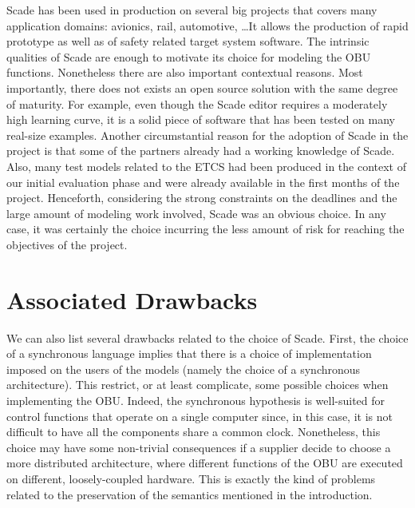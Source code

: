 \documentclass{template/openetcs_report}
\begin{document}
Scade has been used in production on several big projects that covers
many application domains: avionics, rail, automotive, \dots It allows
the production of rapid prototype as well as of safety related target
system software. The intrinsic qualities of Scade are enough to
motivate its choice for modeling the OBU functions. Nonetheless there
are also important contextual reasons. Most importantly, there does
not exists an open source solution with the same degree of
maturity. For example, even though the Scade editor requires a
moderately high learning curve, it is a solid piece of software that
has been tested on many real-size examples. Another circumstantial
reason for the adoption of Scade in the project is that some of the
partners already had a working knowledge of Scade. Also, many test
models related to the ETCS had been produced in the context of our
initial evaluation phase and were already available in the first
months of the project. Henceforth, considering the strong constraints
on the deadlines and the large amount of modeling work involved, Scade
was an obvious choice. In any case, it was certainly the choice
incurring the less amount of risk for reaching the objectives of the
project.


\section{Associated Drawbacks}
\label{sec:associated-drawbacks}

We can also list several drawbacks related to the choice of
Scade. First, the choice of a synchronous language implies that there
is a choice of implementation imposed on the users of the models
(namely the choice of a synchronous architecture). This restrict, or
at least complicate, some possible choices when implementing the
OBU. Indeed, the synchronous hypothesis is well-suited for control
functions that operate on a single computer since, in this case, it is
not difficult to have all the components share a common
clock. Nonetheless, this choice may have some non-trivial consequences
if a supplier decide to choose a more distributed architecture, where
different functions of the OBU are executed on different,
loosely-coupled hardware. This is exactly the kind of problems related
to the preservation of the semantics mentioned in the
introduction.
\end{document}
